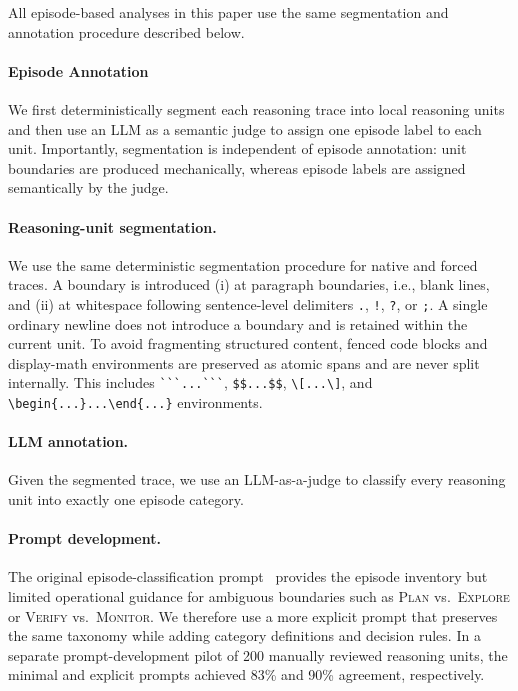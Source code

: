 All episode-based analyses in this paper use the same segmentation and
annotation procedure described below.

\paragraph{Episode Annotation}

We first deterministically segment each reasoning trace into local reasoning
units and then use an LLM as a semantic judge to assign one episode label to
each unit. Importantly, segmentation is independent of episode annotation:
unit boundaries are produced mechanically, whereas episode labels are assigned
semantically by the judge.

\paragraph{Reasoning-unit segmentation.}
We use the same deterministic segmentation procedure for native and
forced traces. A boundary is introduced
(i) at paragraph boundaries, i.e., blank lines, and
(ii) at whitespace following sentence-level delimiters
\texttt{.}, \texttt{!}, \texttt{?}, or \texttt{;}.
A single ordinary newline does not introduce a boundary and is retained
within the current unit.
To avoid fragmenting structured content, fenced code blocks and
display-math environments are preserved as atomic spans and are never
split internally. This includes
\verb|```...```|,
\verb|$$...$$|,
\verb|\[...\]|, and
\verb|\begin{...}...\end{...}| environments.

\paragraph{LLM annotation.}
Given the segmented trace, we use an LLM-as-a-judge to classify every
reasoning unit into exactly one episode category.

\paragraph{Prompt development.}
The original episode-classification prompt~\citep{li-etal-2025-understanding,li-etal-2026-schoenfelds} provides the episode inventory but
limited operational guidance for ambiguous boundaries such as
\textsc{Plan} vs.\ \textsc{Explore} or
\textsc{Verify} vs.\ \textsc{Monitor}. We therefore use a more explicit prompt
that preserves the same taxonomy while adding category definitions and
decision rules. In a separate prompt-development pilot of 200 manually reviewed reasoning
units, the minimal and explicit prompts achieved 83\% and 90\% agreement,
respectively.

